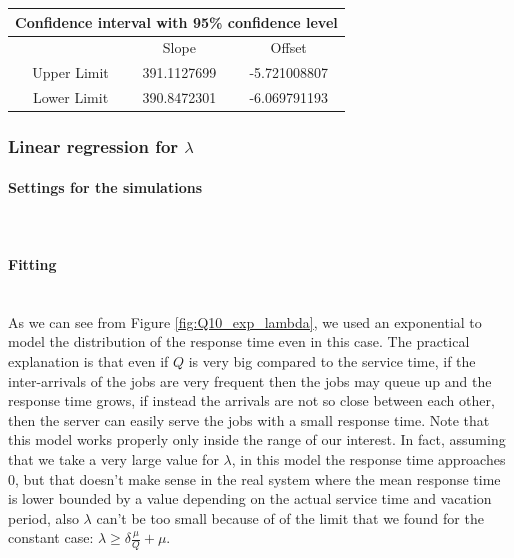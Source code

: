\documentclass{article}
\begin{document}
                    \begin{table}[htbp]
                        \centering 
                        \begin{tabular}{|c|c|c|}
                            
                            \hline
                            \multicolumn{3}{|c|}{\bf Confidence interval with 95\% confidence level} \\
                            
                            \hline
                            \ & Slope & Offset\\
                            \hline
                            \ Upper Limit & 391.1127699 & -5.721008807 \\ 
                            \hline
                            \ Lower Limit & 390.8472301 & -6.069791193 \\ 
                            \hline
                        \end{tabular}
                        \label{table:CI_10_fitting_mu}
                    \end{table}
            
            \subsubsection{Linear regression for $\lambda$}
                \paragraph{Settings for the simulations} \hfill \\
                    
                \paragraph{Fitting} \hfill \\

                    As we can see from Figure \ref{fig:Q10_exp_lambda}, we used an exponential to model the distribution of the response time even in this case. The practical explanation is that even if $Q$ is very big compared to the service time, if the inter-arrivals of the jobs are very frequent then the jobs may queue up and the response time grows, if instead the arrivals are not so close between each other, then the server can easily serve the jobs with a small response time. 
                    Note that this model works properly only inside the range of our interest. In fact, assuming that we take a very large value for $\lambda$, in this model the response time approaches $0$, but that doesn't make sense in the real system where the mean response time is lower bounded by a value depending on the actual service time and vacation period, also $\lambda$ can't be too small because of of the limit that we found for the constant case: 
                    $\lambda \ge \delta \frac{\mu}{Q} + \mu$.
                    
\end{document}

